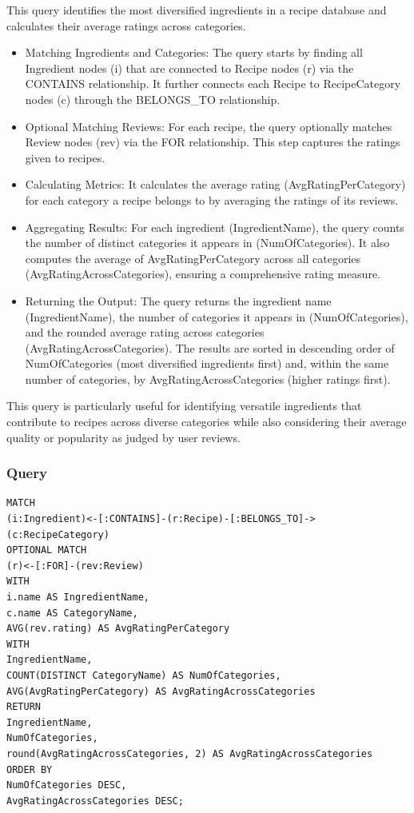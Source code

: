 \begin{enumerate}
    This query identifies the most diversified ingredients in a recipe database and calculates their average ratings across categories.
    \begin{itemize}
        \item Matching Ingredients and Categories:
The query starts by finding all Ingredient nodes (i) that are connected to Recipe nodes (r) via the CONTAINS relationship.
It further connects each Recipe to RecipeCategory nodes (c) through the BELONGS\_TO relationship.
        \item Optional Matching Reviews:
For each recipe, the query optionally matches Review nodes (rev) via the FOR relationship. This step captures the ratings given to recipes.
        \item Calculating Metrics:
It calculates the average rating (AvgRatingPerCategory) for each category a recipe belongs to by averaging the ratings of its reviews.
        \item Aggregating Results:
For each ingredient (IngredientName), the query counts the number of distinct categories it appears in (NumOfCategories).
It also computes the average of AvgRatingPerCategory across all categories (AvgRatingAcrossCategories), ensuring a comprehensive rating measure.
        \item Returning the Output:
The query returns the ingredient name (IngredientName), the number of categories it appears in (NumOfCategories), and the rounded average rating across categories (AvgRatingAcrossCategories).
The results are sorted in descending order of NumOfCategories (most diversified ingredients first) and, within the same number of categories, by AvgRatingAcrossCategories (higher ratings first).
    \end{itemize}
This query is particularly useful for identifying versatile ingredients that contribute to recipes across diverse categories while also considering their average quality or popularity as judged by user reviews.
    \subsubsection{Query}
    \begin{verbatim}
MATCH 
(i:Ingredient)<-[:CONTAINS]-(r:Recipe)-[:BELONGS_TO]->(c:RecipeCategory)
OPTIONAL MATCH  
(r)<-[:FOR]-(rev:Review)
WITH 
i.name AS IngredientName, 
c.name AS CategoryName, 
AVG(rev.rating) AS AvgRatingPerCategory
WITH 
IngredientName, 
COUNT(DISTINCT CategoryName) AS NumOfCategories, 
AVG(AvgRatingPerCategory) AS AvgRatingAcrossCategories
RETURN 
IngredientName, 
NumOfCategories, 
round(AvgRatingAcrossCategories, 2) AS AvgRatingAcrossCategories
ORDER BY 
NumOfCategories DESC, 
AvgRatingAcrossCategories DESC;
    \end{verbatim}

\end{enumerate}
